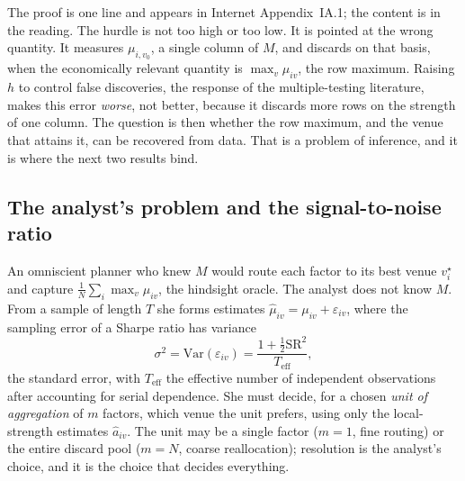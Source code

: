 \documentclass[12pt]{article}
\theoremstyle{plain}
\theoremstyle{definition}
\newcommand{\Var}{\mathrm{Var}}
\newcommand{\SR}{\mathrm{SR}}
\begin{document}
\noindent The proof is one line and appears in Internet Appendix~IA.1;
the content is in the reading. The hurdle is not too high or too low. It is
pointed at the wrong quantity. It measures $\mu_{i,v_0}$, a single column of
$M$, and discards on that basis, when the economically relevant quantity is
$\max_v\mu_{iv}$, the row maximum. Raising $h$ to control false discoveries, the
response of the multiple-testing literature, makes this error \emph{worse}, not
better, because it discards more rows on the strength of one column. The question
is then whether the row maximum, and the venue that attains it, can be recovered
from data. That is a problem of inference, and it is where the next two results
bind.

\subsection{The analyst's problem and the signal-to-noise ratio}

An omniscient planner who knew $M$ would route each factor to its best venue
$v^\star_i$ and capture $\frac1N\sum_i\max_v\mu_{iv}$, the hindsight oracle. The
analyst does not know $M$. From a sample of length $T$ she forms estimates
$\hat\mu_{iv}=\mu_{iv}+\varepsilon_{iv}$, where the sampling error of a Sharpe
ratio has variance
\begin{equation}
\sigma^2=\Var(\varepsilon_{iv})=\frac{1+\tfrac12\SR^2}{T_{\text{eff}}},
\label{eq:lo}
\end{equation}
the \citet{Lo2002} standard error, with $T_{\text{eff}}$ the effective number of
independent observations after accounting for serial dependence. She must decide,
for a chosen \emph{unit of aggregation} of $m$ factors, which venue the unit
prefers, using only the local-strength estimates $\hat a_{iv}$. The unit may be a
single factor ($m=1$, fine routing) or the entire discard pool ($m=N$, coarse
reallocation); resolution is the analyst's choice, and it is the choice that
decides everything.
\end{document}
